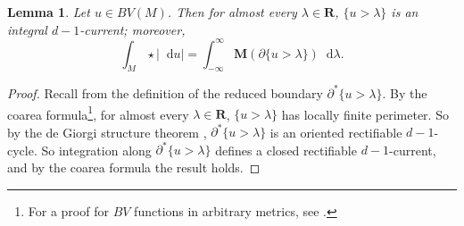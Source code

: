 \documentclass[reqno,11pt]{amsart}
\newcommand{\RR}{\mathbf{R}}
\newcommand*\dif{\mathop{}\!\mathrm{d}}
\newcommand{\Mass}{\mathbf M}
\newtheorem{lemma}[theorem]{Lemma}
\theoremstyle{definition}
\numberwithin{equation}{section}
\begin{document}
\begin{lemma}\label{reduced level sets are integral currents}
Let $u \in BV(M)$.
Then for almost every $\lambda \in \RR$, $\{u > \lambda\}$ is an integral $d - 1$-current; moreover,
$$\int_M \star |\dif u| = \int_{-\infty}^\infty \Mass(\partial \{u > \lambda\}) \dif \lambda.$$
\end{lemma}
\begin{proof}
Recall from \cite[Chapter 3]{Giusti77} the definition of the reduced boundary $\partial^* \{u > \lambda\}$.
By the coarea formula\footnote{For a proof for $BV$ functions in arbitrary metrics, see \cite[Proposition 2.5]{BackusFLG}.}, for almost every $\lambda \in \RR$, $\{u > \lambda\}$ has locally finite perimeter.
So by the de Giorgi structure theorem \cite[Theorem 14.3]{Simon84}, $\partial^* \{u > \lambda\}$ is an oriented rectifiable $d - 1$-cycle.
So integration along $\partial^* \{u > \lambda\}$ defines a closed rectifiable $d - 1$-current, and by the coarea formula the result holds.
\end{proof}
\end{document}

